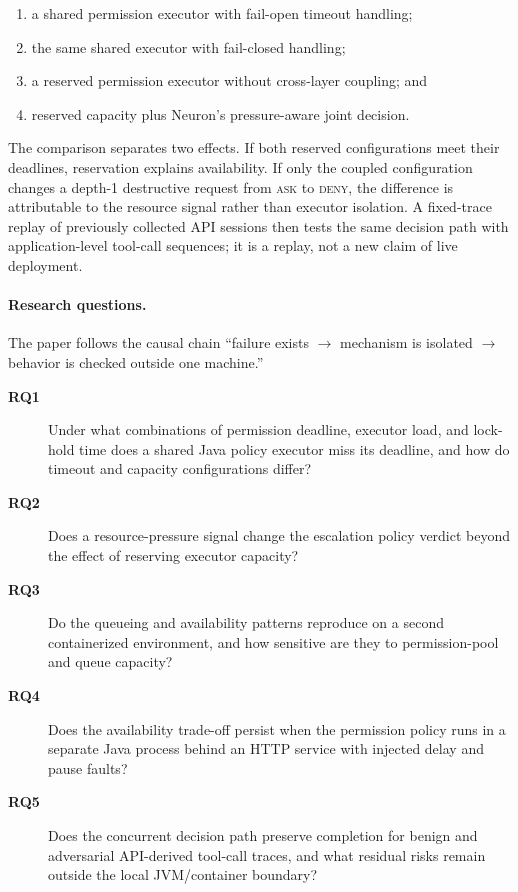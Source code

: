 \begin{enumerate}
  \item a shared permission executor with fail-open timeout handling;
  \item the same shared executor with fail-closed handling;
  \item a reserved permission executor without cross-layer coupling; and
  \item reserved capacity plus Neuron's pressure-aware joint decision.
\end{enumerate}

The comparison separates two effects. If both reserved configurations meet
their deadlines, reservation explains availability. If only the coupled
configuration changes a depth-1 destructive request from \textsc{ask} to
\textsc{deny}, the difference is attributable to the resource signal rather
than executor isolation. A fixed-trace replay of previously collected API
sessions then tests the same decision path with application-level tool-call
sequences; it is a replay, not a new claim of live deployment.

\paragraph{Research questions.}
The paper follows the causal chain ``failure exists $\rightarrow$ mechanism
is isolated $\rightarrow$ behavior is checked outside one machine.''

\begin{description}
  \item[\textbf{RQ1}] Under what combinations of permission deadline,
  executor load, and lock-hold time does a shared Java policy executor miss
  its deadline, and how do timeout and capacity configurations differ?
  \item[\textbf{RQ2}] Does a resource-pressure signal change the escalation
  policy verdict beyond the effect of reserving executor capacity?
  \item[\textbf{RQ3}] Do the queueing and availability patterns reproduce on
  a second containerized environment, and how sensitive are they to
  permission-pool and queue capacity?
  \item[\textbf{RQ4}] Does the availability trade-off persist when the
  permission policy runs in a separate Java process behind an HTTP service
  with injected delay and pause faults?
  \item[\textbf{RQ5}] Does the concurrent decision path preserve completion
  for benign and adversarial API-derived tool-call traces, and what residual
  risks remain outside the local JVM/container boundary?
\end{description}

